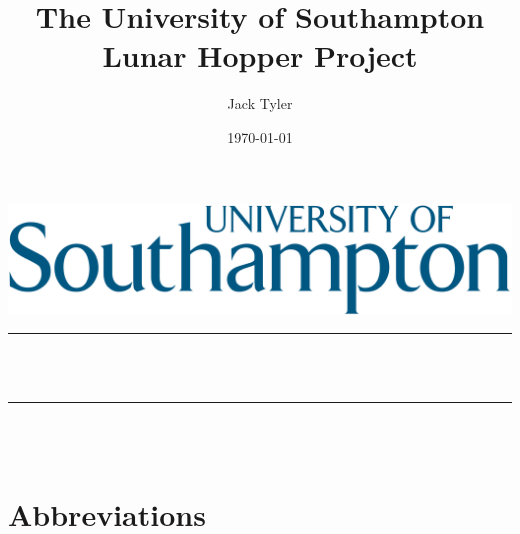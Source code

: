 \documentclass[12pt]{article}
\title{The University of Southampton \\ \vspace{2pt} Lunar Hopper Project}								%
\author{Jack Tyler}								%
\date{\today}											%
\makeatletter
\let\thetitle\@title
\let\theauthor\@author
\let\thedate\@date
\makeatother
\begin{document}

\begin{titlepage}
	\centering
    \vspace*{0.5 cm}
    \includegraphics[width=\linewidth]{uos_svg}\\[1.0 cm]	%
	\rule{\linewidth}{0.2 mm} \\[0.4 cm]
	{ \huge \bfseries \thetitle}\\
	\rule{\linewidth}{0.2 mm} \\[1.5 cm]
	
	
	{\large \thedate}\\[2 cm]
 
	\vfill
	
\end{titlepage}

\section*{Abbreviations}
\end{document}
